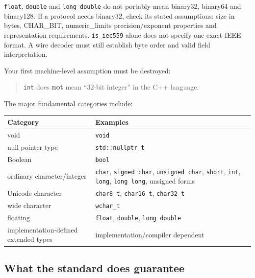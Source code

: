 \texttt{float}, \texttt{double} and \texttt{long\ double} do not portably mean binary32, binary64 and binary128. If a protocol needs binary32, check its stated assumptions: size in bytes, CHAR\_BIT, numeric\_limits precision/exponent properties and representation requirements. \texttt{is\_iec559} alone does not specify one exact IEEE format. A wire decoder must still establish byte order and valid field interpretation.

Your first machine-level assumption must be destroyed:

\begin{quote}
\texttt{int} does \textbf{not} mean ``32-bit integer'' in the C++ language.
\end{quote}

The major fundamental categories include:

{\def\LTcaptype{none} %
\begin{longtable}[]{@{}
  >{\raggedright\arraybackslash}p{}
  >{\raggedright\arraybackslash}p{}@{}}
\toprule\noalign{}
\begin{minipage}[b]{\linewidth}\raggedright
Category
\end{minipage} & \begin{minipage}[b]{\linewidth}\raggedright
Examples
\end{minipage} \\
\midrule\noalign{}
\endhead
\bottomrule\noalign{}
\endlastfoot
void & \texttt{void} \\
null pointer type & \texttt{std::nullptr\_t} \\
Boolean & \texttt{bool} \\
ordinary character/integer & \texttt{char}, \texttt{signed\ char}, \texttt{unsigned\ char}, \texttt{short}, \texttt{int}, \texttt{long}, \texttt{long\ long}, unsigned forms \\
Unicode character & \texttt{char8\_t}, \texttt{char16\_t}, \texttt{char32\_t} \\
wide character & \texttt{wchar\_t} \\
floating & \texttt{float}, \texttt{double}, \texttt{long\ double} \\
implementation-defined extended types & implementation/compiler dependent \\
\end{longtable}
}

\subsection{What the standard does guarantee}\label{05-engine-i-ch002-what-the-standard-does-guarantee}

